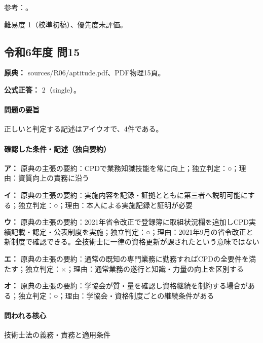 \par 参考：\cite{cpd_v3}。

\par 難易度 1（校準初稿）、優先度未評価。

\subsection{令和6年度 問15}
\label{q:r06-reg-apt-15}

\noindent\textbf{原典：} sources/R06/aptitude.pdf、PDF物理15頁。

\textbf{公式正答：} 2（single）。

\paragraph{問題の要旨} 正しいと判定する記述はアイウオで、4件である。

\paragraph{確認した条件・記述（独自要約）}\mbox{}\par

\noindent\textbf{ア：} 原典の主張の要約：CPDで業務知識技能を常に向上；独立判定：○；理由：資質向上の責務に沿う\par

\noindent\textbf{イ：} 原典の主張の要約：実施内容を記録・証拠とともに第三者へ説明可能にする；独立判定：○；理由：本人による実施記録と証明が必要\par

\noindent\textbf{ウ：} 原典の主張の要約：2021年省令改正で登録簿に取組状況欄を追加しCPD実績記載・認定・公表制度を実施；独立判定：○；理由：2021年9月の省令改正と新制度で確認できる。全技術士に一律の資格更新が課されたという意味ではない\par

\noindent\textbf{エ：} 原典の主張の要約：通常の既知の専門業務に勤務すればCPDの全要件を満たす；独立判定：×；理由：通常業務の遂行と知識・力量の向上を区別する\par

\noindent\textbf{オ：} 原典の主張の要約：学協会が質・量を確認し資格継続を制約する場合がある；独立判定：○；理由：学協会・資格制度ごとの継続条件がある\par

\paragraph{問われる核心} 技術士法の義務・責務と適用条件

